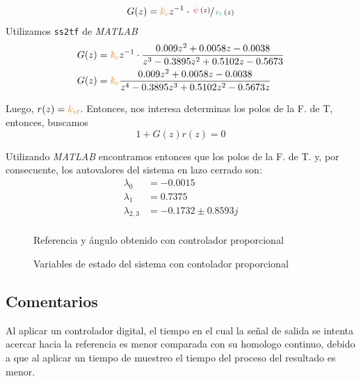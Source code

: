 \begin{align}
  G(z) &= \nara{k_{c}}z^{-1} \cdot \sfrac{\rojo{\psi}(z)}{\verd{v_{i}}(z)} \\
\end{align}
Utilizamos \verb|ss2tf| de \textit{MATLAB} 
\begin{align}
  G(z) &= \nara{k_{c}}z^{-1} \cdot \frac{0.009z^{2} + 0.0058z - 0.0038}{z^{3} - 0.3895z^{2} + 0.5102z - 0.5673} \\
  G(z) &= \nara{k_{c}}\frac{0.009z^{2} + 0.0058z - 0.0038}{z^{4} - 0.3895z^{3} + 0.5102z^{2} - 0.5673z}
\end{align}

Luego, $r(z) = \nara{k_{st}}$. Entonces, nos interesa determinas los polos de
la F. de T, entonces, buscamos
\begin{equation}
  1 + G(z)r(z) = 0
\end{equation}

Utilizando \textit{MATLAB} encontramos entonces que los polos de la F. de T. y,
por consecuente, los autovalores del sistema en lazo cerrado son:
\begin{align}
  \lambda_{0} &= -0.0015 \\
  \lambda_{1} &= 0.7375 \\
  \lambda_{2,3} &= -0.1732 \pm 0.8593j \\
\end{align}

\begin{figure}[h]
  \centering
  
  \caption{Referencia y ángulo obtenido con controlador proporcional}\label{fig:psi-prop-disc}
\end{figure}

\begin{figure}[h]
  \centering
  
  \caption{Variables de estado del sistema con contolador proporcional}\label{fig:estado-prop-disc}
\end{figure}


\FloatBarrier


\subsection{Comentarios}

Al aplicar un controlador digital, el tiempo en el cual la señal de salida se intenta acercar 
hacia la referencia es menor comparada con su homologo continuo, debido a que al aplicar 
un tiempo de muestreo el tiempo del proceso del resultado es menor. 



